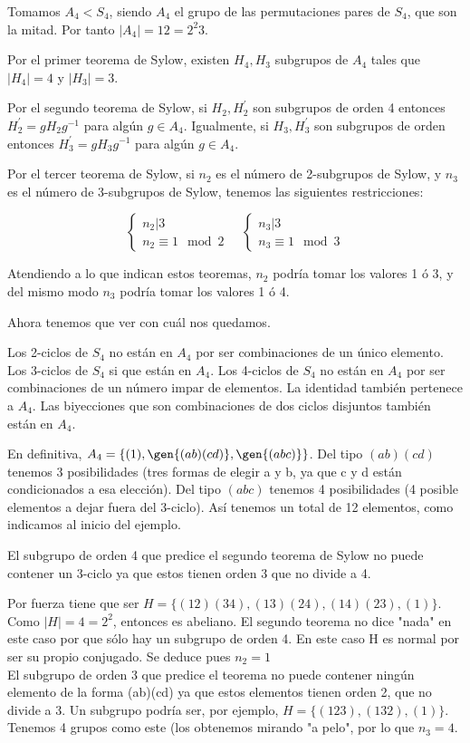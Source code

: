 \documentclass[nochap]{apuntes}
\begin{document}
\begin{example}
 Tomamos $A_4<S_4$, siendo $A_4$  el grupo de las permutaciones pares de $S_4$, que son la mitad. Por tanto $|A_4|=12=2^{2}3$.
 
 Por el primer teorema de Sylow, existen $H_4, H_3$  subgrupos de $A_4$  tales que $|H_4|=4$ y $|H_3|=3$.
 
 Por el segundo teorema de Sylow, si $H_2, H_2^{'}$  son subgrupos de orden 4 entonces $H_2^{'}=gH_2g^{-1}$  para algún $g\in A_4$. Igualmente, si $H_3, H_3^{'}$  son subgrupos de orden entonces $H_3^{'}=gH_3g^{-1}$  para algún $g\in A_4$.
 
 Por el tercer teorema de Sylow, si $n_2$ es el número de 2-subgrupos de Sylow, y $n_3$ es el número de 3-subgrupos de Sylow, tenemos las siguientes restricciones:
 
 \[ \begin{cases} n_2 | 3 \\ n_2 \equiv 1\mod 2 \end{cases}\quad
 \begin{cases} n_3 | 3 \\ n_3 \equiv 1 \mod 3\end{cases} \]
 
 Atendiendo a lo que indican estos teoremas, $n_2$  podría tomar los valores 1 ó 3, y del mismo modo $n_3$  podría tomar los valores 1 ó 4.
 
 Ahora tenemos que ver con cuál nos quedamos.
 
 Los 2-ciclos de $S_4$  no están en $A_4$  por ser combinaciones de un único elemento. Los 3-ciclos de $S_4$  si que están en $A_4$. Los 4-ciclos de $S_4$  no están en $A_4$  por ser combinaciones de un número impar de elementos.  La identidad también pertenece a $A_4$. Las biyecciones que son combinaciones de dos ciclos disjuntos también están en $A_4$.
 
 En definitiva, $A_4=\{(1), \gen{(ab)(cd)}, \gen{(abc)}\}$. Del tipo $(ab)(cd)$ tenemos 3 posibilidades (tres formas de elegir a y b, ya que c y d
 están condicionados a esa elección). Del tipo $(abc)$ tenemos 4 posibilidades (4 posible elementos a dejar fuera del 3-ciclo). Así tenemos un total de 12 elementos, como indicamos al inicio del ejemplo.
 
 El subgrupo de orden 4 que predice el segundo teorema de Sylow no puede contener un 3-ciclo ya que estos tienen orden 3 que no divide
 a 4.
 
 Por fuerza tiene que ser $H=\{(12)(34), (13)(24), (14)(23), (1)\}$. Como $|H|=4=2^{2}$, entonces es abeliano.
 El segundo teorema no dice "nada" en este caso por que sólo hay un subgrupo de orden 4. En este caso H es normal por ser su propio
 conjugado. Se deduce pues $n_2=1$\\
 
 El subgrupo de orden 3 que predice el teorema no puede contener ningún elemento de la forma (ab)(cd) ya que estos elementos tienen
 orden 2, que no divide a 3. Un subgrupo podría ser, por ejemplo, $H=\{(123),(132),(1)\}$. Tenemos 4 grupos como este (los obtenemos mirando "a pelo", por lo que $n_3=4$.
 \end{example}
\end{document}

